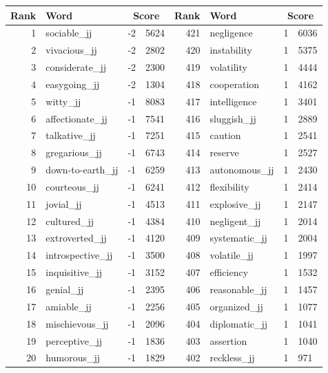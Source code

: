 \begin{table}[tbp]
    \begin{tabular}{| rlr@{.}l | rlr@{.}l |}
    \hline
    \textbf{Rank} & \textbf{Word} & \multicolumn{2}{c|}{\textbf{Score}} & \textbf{Rank} & \textbf{Word} & \multicolumn{2}{c|}{\textbf{Score}} \\
    \hline
    1 & sociable\_jj & -2 & 5624    &    421 & negligence & 1 & 6036 \\
    2 & vivacious\_jj & -2 & 2802    &    420 & instability & 1 & 5375 \\
    3 & considerate\_jj & -2 & 2300    &    419 & volatility & 1 & 4444 \\
    4 & easygoing\_jj & -2 & 1304    &    418 & cooperation & 1 & 4162 \\
    5 & witty\_jj & -1 & 8083    &    417 & intelligence & 1 & 3401 \\
    6 & affectionate\_jj & -1 & 7541    &    416 & sluggish\_jj & 1 & 2889 \\
    7 & talkative\_jj & -1 & 7251    &    415 & caution & 1 & 2541 \\
    8 & gregarious\_jj & -1 & 6743    &    414 & reserve & 1 & 2527 \\
    9 & down-to-earth\_jj & -1 & 6259    &    413 & autonomous\_jj & 1 & 2430 \\
    10 & courteous\_jj & -1 & 6241    &    412 & flexibility & 1 & 2414 \\
    11 & jovial\_jj & -1 & 4513    &    411 & explosive\_jj & 1 & 2147 \\
    12 & cultured\_jj & -1 & 4384    &    410 & negligent\_jj & 1 & 2014 \\
    13 & extroverted\_jj & -1 & 4120    &    409 & systematic\_jj & 1 & 2004 \\
    14 & introspective\_jj & -1 & 3500    &    408 & volatile\_jj & 1 & 1997 \\
    15 & inquisitive\_jj & -1 & 3152    &    407 & efficiency & 1 & 1532 \\
    16 & genial\_jj & -1 & 2395    &    406 & reasonable\_jj & 1 & 1457 \\
    17 & amiable\_jj & -1 & 2256    &    405 & organized\_jj & 1 & 1077 \\
    18 & mischievous\_jj & -1 & 2096    &    404 & diplomatic\_jj & 1 & 1041 \\
    19 & perceptive\_jj & -1 & 1836    &    403 & assertion & 1 & 1040 \\
    20 & humorous\_jj & -1 & 1829    &    402 & reckless\_jj & 1 & 971 \\

\end{tabular}
\end{table}

